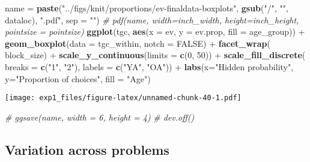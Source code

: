 \documentclass[11pt,,]{article}
\newenvironment{Shaded}{\begin{snugshade}}{\end{snugshade}}
\newcommand{\KeywordTok}[1]{\textcolor[rgb]{0.13,0.29,0.53}{\textbf{{#1}}}}
\newcommand{\DataTypeTok}[1]{\textcolor[rgb]{0.13,0.29,0.53}{{#1}}}
\newcommand{\DecValTok}[1]{\textcolor[rgb]{0.00,0.00,0.81}{{#1}}}
\newcommand{\StringTok}[1]{\textcolor[rgb]{0.31,0.60,0.02}{{#1}}}
\newcommand{\CommentTok}[1]{\textcolor[rgb]{0.56,0.35,0.01}{\textit{{#1}}}}
\newcommand{\OtherTok}[1]{\textcolor[rgb]{0.56,0.35,0.01}{{#1}}}
\newcommand{\NormalTok}[1]{{#1}}
\begin{document}
\begin{Shaded}
\begin{Highlighting}[]
\NormalTok{name =}\StringTok{ }\KeywordTok{paste}\NormalTok{(}\StringTok{"../figs/knit/proportions/ev-finaldata-boxplots"}\NormalTok{, }
             \KeywordTok{gsub}\NormalTok{(}\StringTok{"/"}\NormalTok{, }\StringTok{""}\NormalTok{, dataloc), }\StringTok{".pdf"}\NormalTok{, }\DataTypeTok{sep =} \StringTok{""}\NormalTok{)}
\CommentTok{# pdf(name, width=inch_width, height=inch_height, pointsize = pointsize)}
\KeywordTok{ggplot}\NormalTok{(tgc, }\KeywordTok{aes}\NormalTok{(}\DataTypeTok{x =} \NormalTok{ev, }\DataTypeTok{y =} \NormalTok{ev.prop, }\DataTypeTok{fill =} \NormalTok{age_group)) +}\StringTok{ }
\StringTok{  }\KeywordTok{geom_boxplot}\NormalTok{(}\DataTypeTok{data =} \NormalTok{tgc_within, }\DataTypeTok{notch =} \OtherTok{FALSE}\NormalTok{) +}\StringTok{ }
\StringTok{  }\KeywordTok{facet_wrap}\NormalTok{(~}\StringTok{ }\NormalTok{block_size) +}\StringTok{ }
\StringTok{  }\KeywordTok{scale_y_continuous}\NormalTok{(}\DataTypeTok{limits =} \KeywordTok{c}\NormalTok{(}\DecValTok{0}\NormalTok{, }\DecValTok{50}\NormalTok{)) +}\StringTok{ }
\StringTok{  }\KeywordTok{scale_fill_discrete}\NormalTok{(}
    \DataTypeTok{breaks =} \KeywordTok{c}\NormalTok{(}\StringTok{"1"}\NormalTok{, }\StringTok{"2"}\NormalTok{),}
    \DataTypeTok{labels =} \KeywordTok{c}\NormalTok{(}\StringTok{"YA"}\NormalTok{, }\StringTok{"OA"}\NormalTok{)) +}\StringTok{ }
\StringTok{  }\KeywordTok{labs}\NormalTok{(}\DataTypeTok{x=}\StringTok{"Hidden probability"}\NormalTok{, }\DataTypeTok{y=}\StringTok{"Proportion of choices"}\NormalTok{, }\DataTypeTok{fill =} \StringTok{"Age"}\NormalTok{)}
\end{Highlighting}
\end{Shaded}

\texttt{[image: exp1\_files/figure-latex/unnamed-chunk-40-1.pdf]}

\begin{Shaded}
\begin{Highlighting}[]
\CommentTok{# ggsave(name, width = 6, height = 4)}
\CommentTok{# dev.off()}
\end{Highlighting}
\end{Shaded}

\newpage

\newpage

\subsection{Variation across problems}\label{variation-across-problems}
\end{document}
